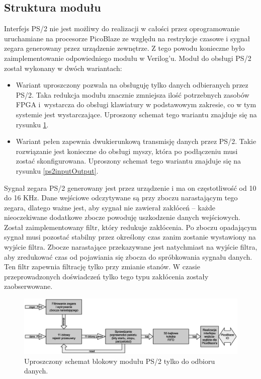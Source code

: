 \subsection{Struktura modułu}

Interfejs PS/2 nie jest możliwy do realizacji w całości przez oprogramowanie uruchamiane na procesorze PicoBlaze ze względu na restrykcje czasowe i sygnał zegara generowany przez urządzenie zewnętrze. Z tego powodu konieczne było zaimplementowanie odpowiedniego modułu w Verilog'u. Moduł do obsługi PS/2 został wykonany w dwóch wariantach:
\begin{itemize}
	\item Wariant uproszczony pozwala na obsługuję tylko danych odbieranych przez PS/2. Taka redukcja modułu znacznie zmniejsza ilość potrzebnych zasobów FPGA i~wystarcza do obsługi klawiatury w podstawowym zakresie, co w tym systemie jest wystarczające. Uproszony schemat tego wariantu znajduje się na rysunku \ref{ps2input_flow}.
	\item Wariant pełen zapewnia dwukierunkową transmisję danych przez PS/2. Takie rozwiązanie jest konieczne do obsługi myszy, która po podłączeniu musi zostać skonfigurowana. Uproszony schemat tego wariantu znajduje się na rysunku \ref{ps2inputOutput}.
\end{itemize}


Sygnał zegara PS/2 generowany jest przez urządzenie i ma on częstotliwość od 10 do 16 KHz. Dane wejściowe odczytywane są przy zboczu narastającym tego zegara, dlatego ważne jest, aby sygnał nie zawierał zakłóceń -- każde nieoczekiwane dodatkowe zbocze powoduję uszkodzenie danych wejściowych. Został zaimplementowany filtr, który redukuje zakłócenia. Po zboczu opadającym sygnał musi pozostać stabilny przez określony czas zanim zostanie wystawiony na wyjście filtra. Zbocze narastające przekazywane jest natychmiast na wyjście filtra, aby zredukować czas od pojawiania się zbocza do spróbkowania sygnału danych. Ten filtr zapewnia filtrację tylko przy zmianie stanów. W czasie przeprowadzonych doświadczeń tylko tego typu zakłócenia zostały zaobserwowane.

\begin{figure}[htb]
	\centering
	\includegraphics[width=16cm]{obrazki/ps2input_flow.eps}
	\caption{Uproszczony schemat blokowy modułu PS/2 tylko do odbioru danych.}
	\label{ps2input_flow}
\end{figure}

